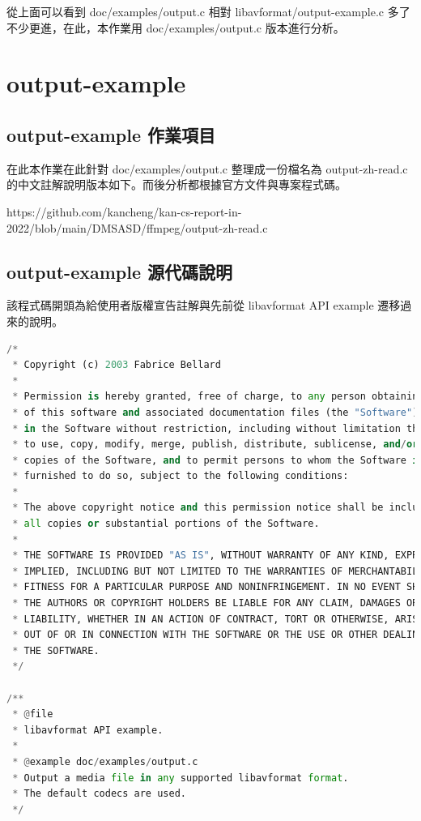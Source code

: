 \documentclass[10pt,UTF8]{ctexart}
\begin{document}
從上面可以看到 doc/examples/output.c 相對 libavformat/output-example.c 多了不少更進，在此，本作業用 doc/examples/output.c 版本進行分析。

\section{output-example}

\subsection{output-example 作業項目}

在此本作業在此針對  doc/examples/output.c 整理成一份檔名為 output-zh-read.c 的中文註解說明版本如下。而後分析都根據官方文件與專案程式碼。

https://github.com/kancheng/kan-cs-report-in-2022/blob/main/DMSASD/ffmpeg/output-zh-read.c

\subsection{output-example 源代碼說明}

該程式碼開頭為給使用者版權宣告註解與先前從 libavformat API example 遷移過來的說明。

\begin{lstlisting}[language={python}]
/*
 * Copyright (c) 2003 Fabrice Bellard
 *
 * Permission is hereby granted, free of charge, to any person obtaining a copy
 * of this software and associated documentation files (the "Software"), to deal
 * in the Software without restriction, including without limitation the rights
 * to use, copy, modify, merge, publish, distribute, sublicense, and/or sell
 * copies of the Software, and to permit persons to whom the Software is
 * furnished to do so, subject to the following conditions:
 *
 * The above copyright notice and this permission notice shall be included in
 * all copies or substantial portions of the Software.
 *
 * THE SOFTWARE IS PROVIDED "AS IS", WITHOUT WARRANTY OF ANY KIND, EXPRESS OR
 * IMPLIED, INCLUDING BUT NOT LIMITED TO THE WARRANTIES OF MERCHANTABILITY,
 * FITNESS FOR A PARTICULAR PURPOSE AND NONINFRINGEMENT. IN NO EVENT SHALL
 * THE AUTHORS OR COPYRIGHT HOLDERS BE LIABLE FOR ANY CLAIM, DAMAGES OR OTHER
 * LIABILITY, WHETHER IN AN ACTION OF CONTRACT, TORT OR OTHERWISE, ARISING FROM,
 * OUT OF OR IN CONNECTION WITH THE SOFTWARE OR THE USE OR OTHER DEALINGS IN
 * THE SOFTWARE.
 */

/**
 * @file
 * libavformat API example.
 *
 * @example doc/examples/output.c
 * Output a media file in any supported libavformat format.
 * The default codecs are used.
 */
\end{lstlisting}
\end{document}
